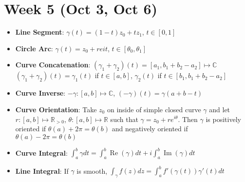 \documentclass[12pt]{article}
\newcommand{\R}{\mathbb{R}}
\newcommand{\C}{\mathbb{C}}
\DeclareMathOperator{\real}{Re}
\DeclareMathOperator{\imgn}{Im}
\begin{document}
\section*{Week 5 (Oct 3, Oct 6)}
\begin{itemize}
    \item \textbf{Line Segment}: $\gamma(t)=(1-t)z_0+tz_1$, $t\in[0,1]$
    \item \textbf{Circle Arc}: $\gamma(t)=z_0+re{it}$, $t\in[\theta_0,\theta_1]$
    \item \textbf{Curve Concatenation}: $(\gamma_1+\gamma_2)(t)=[a_1,b_1+b_2-a_2]\mapsto\C$\\
    $(\gamma_1+\gamma_2)(t)=\gamma_1(t)$ if $t\in[a,b]$, $\gamma_2(t)$ if $t\in[b_1,b_1+b_2-a_2]$
    \item \textbf{Curve Inverse}: $-\gamma:[a,b]\mapsto\C$, $(-\gamma)(t)=\gamma(a+b-t)$
    \item \textbf{Curve Orientation}: Take $z_0$ on inside of simple closed curve $\gamma$ and let $r:[a,b]\mapsto\R_{>0}$, $\theta:[a,b]\mapsto\R$ such that $\gamma=z_0+re^{i\theta}$. Then $\gamma$ is positively oriented if $\theta(a)+2\pi=\theta(b)$ and negatively oriented if $\theta(a)-2\pi=\theta(b)$
    \item \textbf{Curve Integral}: $\int_a^b\gamma dt=\int_a^b\real(\gamma)dt+i\int_a^b\imgn(\gamma)dt$
    \item \textbf{Line Integral}: If $\gamma$ is smooth, $\int_\gamma f(z)dz=\int_a^bf'(\gamma(t))\gamma'(t)dt$
\end{itemize}
\end{document}
